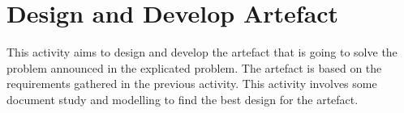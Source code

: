 \chapter{Design and Develop Artefact}
This activity aims to design and develop the artefact that is going to solve the problem announced in the explicated problem. The artefact is based on the requirements gathered in the previous activity. This activity involves some document study and modelling to find the best design for the artefact.


